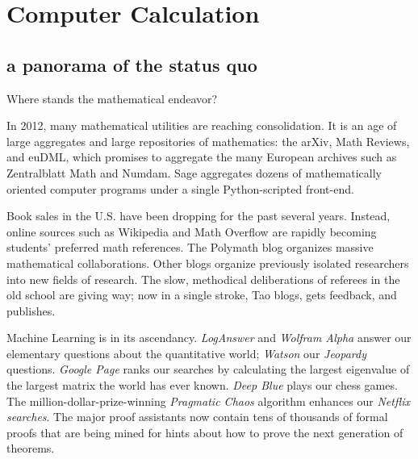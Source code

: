 \documentclass{llncs}
\begin{document}
\newpage



\section{Computer Calculation}

\subsection{a panorama of the status quo}

Where stands the mathematical endeavor?

In 2012, many mathematical utilities are reaching consolidation.  It
is an age of large aggregates and large repositories of mathematics:
the arXiv, Math Reviews, and euDML, which promises to aggregate the
many European archives such as Zentralblatt Math and Numdam.  Sage
aggregates dozens of mathematically oriented computer
programs under a single Python-scripted front-end.


Book sales in the U.S. have been dropping  for the past several years. 
Instead, online sources such as  Wikipedia and Math Overflow
are rapidly becoming students'
preferred math references. The Polymath blog organizes massive
mathematical collaborations.  Other blogs organize previously isolated
researchers into new fields of research.  The slow, methodical
deliberations of referees in the old school are giving way;
now in a single stroke,  Tao blogs, gets feedback, and publishes.



Machine Learning is in its ascendancy.  {\it LogAnswer} and {\it
  Wolfram Alpha} answer our elementary questions about the
quantitative world; {\it Watson} our {\it Jeopardy} questions. {\it
  Google Page} ranks our searches by calculating the largest
eigenvalue of the largest matrix the world has ever known.  {\it Deep
  Blue} plays our chess games. The million-dollar-prize-winning {\it
  Pragmatic Chaos} algorithm enhances our {\it Netflix searches}.  The
major proof assistants now contain tens of thousands of formal proofs
that are being mined for hints about how to prove the next generation
of theorems.
\end{document}
